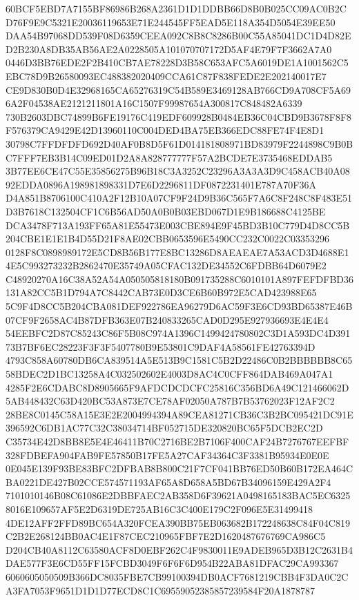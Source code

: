 \documentclass[UTF8,fontset=fandol,zihao=-4,a4paper]{ctexart}
\begin{document}
{{60BCF5EBD7A7155BF86986B268A2361D1D1DDBB66D8B0B025CC09AC0B2CD76F9E9C5321E20036119653E71E244545FF5EAD5E118A354D5054E39EE50
DAA54B97068DD539F08D6359CEEA092C8B8C8286B00C55A85041DC1D4D82ED2B230A8DB35AB56AE2A0228505A101070707172D5AF4E79F7F3662A7A0
0446D3BB76EDE2F2B410CB7AE78228D3B58C653AFC5A6019DE1A1001562C5EBC78D9B26580093EC488382020409CCA61C87F838FEDE2E202140017E7
CE9D830B0D4E32968165CA65276319C54B589E3469128AB766CD9A708CF5A696A2F04538AE2121211801A16C1507F99987654A300817C848482A6339
730B2603DBC74899B6FE19176C419EDF609928B0484EB36C04CBD9B3678F8F8F576379CA9429E42D13960110C004DED4BA75EB366EDC88FE74F4E8D1
30798C7FFDFDFD692D40AF0B8D5F61D014181808971BD83979F2244898C9B0BC7FFF7EB3B14C09ED01D2A8A828777777F57A2BCDE7E3735468EDDAB5
3B77EE6CE47C55E35856275B96B18C3A3252C23296A3A3A3D9C458ACB40A0892EDDA0896A198981898331D7E6D2296811DF0872231401E787A70F36A
D4A851B8706100C410A2F12B10A07CF9F24D9B36C565F7A6C8F248C8F483E51D3B7618C132504CF1C6B56AD50A0B0B03EBD067D1E9B186688C4125BE
DCA3478F713A193FF65A81E55473E003CBE894E9F45BD3B10C779D4D8CC5B204CBE1E1E1B4D55D21F8AE02CBB0653596E5490CC232C0022C03353296
0128F8C0898989172E5CD8B56B177E8BC13286D8AEAEAE7A53ACD3D4688E14E5C993273232B2862470E35749A05CFAC132DE34552C6FDBB64D6079E2
C48920270A16C38A52A54A050505818180B091735288C6010101A897FEFDFBD36131A82CC5B1D794A7C8442CAB73E0D3CE6B60B972E5CAD423988E65
5C9F4D8CC5B204CBA081DEF922786EA96279D6AC59F3E6CD93BD65387E46B07CF9F2658AC4B87DFB363E07B240833265CAD0D295E927936693E4E4E4
54EEBFC2D87C85243C86F5B08C974A1396C1499424780802C3D1A593DC4D39173B7BF6EC28223F3F3F5407780B9E53801C9DAF4A58561FE42763394D
4793C858A60780DB6CA839514A5E513B9C1581C5B2D22486C0B2BBBBBB8C6558BDEC2D1BC13258A4C032502602E4003D8AC4C0CFF864DAB469A047A1
4285F2E6CDABC8D8905665F9AFDCDCDCFC25816C356BD6A49C121466062D5AB448432C63D420BC53A873E7CE78AF02050A787B7B53762023F12AF2C2
28BE8C0145C58A15E3E2E2004994394A89CEA81271CB36C3B2BC095421DC91E396592C6DB1AC77C32C38034714BF052715DE320820BC65F5DCB2EC2D
C35734E42D8BB8E5E4E46411B70C2716BE2B7106F400CAF24B7276767EEFBF328FDBEFA904FAB9FE57850B17FE5A27CAF34364C3F3381B95934E0E0E
0E045E139F93BE83BFC2DFBAB8B800C21F7CF041BB76ED50B60B172EA464CBA0221DE427B02CCE574571193AF65A8D658A5BD67B34096159E429A2F4
7101010146B08C61086E2DBBFAEC2AB358D6F39621A0498165183BAC5EC63258016E109657AF5E2D6319DE725AB16C3C400E179C2F096E5E31499418
4DE12AFF2FFD89BC654A320FCEA390BB75EB063682B172248638C84F04C819C2B2E268124BB0AC4E1F87CEC210965FBF7E2D1620487676769CA986C5
D204CB40A8112C63580ACF8D0EBF262C4F9830011E9ADEB965D3B12C2631B4DAE577F3E6CD55FF15FCBD3049F6F6F6D954B22ABA81DFAC29CA993367
6060605050509B366DC8035FBE7CB99100394DB0ACF7681219CBB4F3DA0C2CA3FA7053F9651D1D1D77ECD8C1C69559052385857239584F20A1878787
}}
\end{document}
